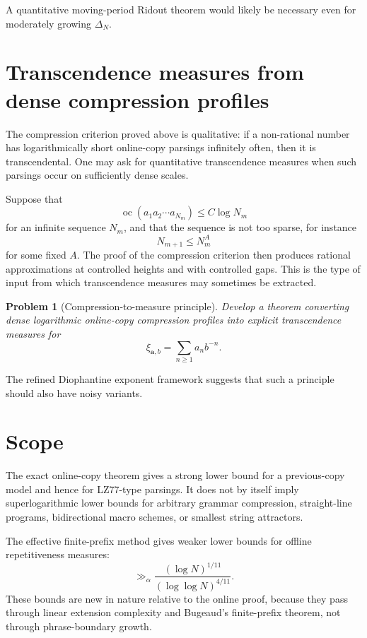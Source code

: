 \documentclass[11pt]{amsart}
\newtheorem{problem}[theorem]{Problem}
\theoremstyle{definition}
\DeclareMathOperator{\oc}{oc}
\begin{document}
A quantitative moving-period Ridout theorem would likely be necessary even for moderately growing \(\Delta_N\).

\section{Transcendence measures from dense compression profiles}

The compression criterion proved above is qualitative: if a non-rational number has logarithmically short online-copy parsings infinitely often, then it is transcendental. One may ask for quantitative transcendence measures when such parsings occur on sufficiently dense scales.

Suppose that
\[
\oc(a_1a_2\cdots a_{N_m})
\leq C\log N_m
\]
for an infinite sequence \(N_m\), and that the sequence is not too sparse, for instance
\[
N_{m+1}\leq N_m^A
\]
for some fixed \(A\). The proof of the compression criterion then produces rational approximations at controlled heights and with controlled gaps. This is the type of input from which transcendence measures may sometimes be extracted.

\begin{problem}[Compression-to-measure principle]
Develop a theorem converting dense logarithmic online-copy compression profiles into explicit transcendence measures for
\[
\xi_{\mathbf a,b}
=
\sum_{n\geq 1}a_n b^{-n}.
\]
\end{problem}

The refined Diophantine exponent framework suggests that such a principle should also have noisy variants.

\section{Scope}

The exact online-copy theorem gives a strong lower bound for a previous-copy model and hence for LZ77-type parsings. It does not by itself imply superlogarithmic lower bounds for arbitrary grammar compression, straight-line programs, bidirectional macro schemes, or smallest string attractors.

The effective finite-prefix method gives weaker lower bounds for offline repetitiveness measures:
\[
\gg_\alpha
\frac{(\log N)^{1/11}}{(\log\log N)^{4/11}}.
\]
These bounds are new in nature relative to the online proof, because they pass through linear extension complexity and Bugeaud's finite-prefix theorem, not through phrase-boundary growth.
\end{document}
